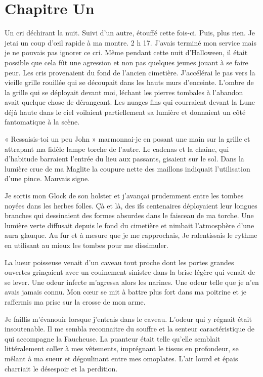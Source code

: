 \chapter[Chapitre Un]{Chapitre Un}
Un cri déchirant la nuit. Suivi d'un autre, étouffé cette fois-ci. Puis, plus rien. Je jetai un coup d'œil rapide à ma 
montre. 2 h 17. J'avais terminé mon service mais je ne pouvais pas ignorer ce cri. Même pendant cette nuit d'Halloween, 
il était possible que cela fût une agression et non pas quelques jeunes jouant à se faire peur. Les cris provenaient du 
fond de l'ancien cimetière. J'accélérai le pas vers la vieille grille rouillée qui se découpait dans les hauts murs 
d'enceinte. L'ombre de la grille qui se déployait devant moi, léchant les pierres tombales à l'abandon avait quelque 
chose de dérangeant. Les nuages fins qui courraient devant la Lune déjà haute dans le ciel voilaient partiellement sa 
lumière et donnaient un côté fantomatique à la scène.

« Ressaisis-toi un peu John » marmonnai-je en posant une main sur la grille et attrapant ma fidèle lampe torche de 
l'autre. Le cadenas et la chaîne, qui d'habitude barraient l'entrée du lieu aux passants, gisaient sur le sol. Dans la 
lumière crue de ma Maglite la coupure nette des maillons indiquait l'utilisation d'une pince. Mauvais signe.

Je sortis mon Glock de son holster et j'avançai prudemment entre les tombes noyées dans les herbes folles. Çà et là, 
des ifs centenaires déployaient leur longues branches qui dessinaient des formes absurdes dans le faisceau de ma 
torche. Une lumière verte diffusait depuis le fond du cimetière et nimbait l'atmosphère d'une aura glauque. Au fur et à 
mesure que je me rapprochais, Je ralentissais le rythme en utilisant au mieux les tombes pour me dissimuler.

La lueur poisseuse venait d'un caveau tout proche dont les portes grandes ouvertes grinçaient avec un couinement 
sinistre dans la brise légère qui venait de se lever. Une odeur infecte m'agressa alors les narines. Une odeur telle 
que je n'en avais jamais connu. Mon cœur se mit à battre plus fort dans ma poitrine et je raffermis ma prise sur la 
crosse de mon arme.

Je faillis m'évanouir lorsque j'entrais dans le caveau. L'odeur qui y régnait était insoutenable. Il me sembla 
reconnaitre du souffre et la senteur caractéristique de qui accompagne la Faucheuse. La puanteur était telle qu'elle 
semblait littéralement coller à mes vêtements, imprégnant le tissus en profondeur, se mêlant à ma sueur et dégoulinant 
entre mes omoplates. L'air lourd et épais charriait le désespoir et la perdition.

